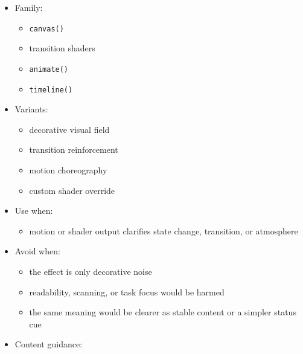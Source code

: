 \begin{itemize}
\tightlist
\item
  Family:

  \begin{itemize}
  \tightlist
  \item
    \texttt{c\allowbreak{}a\allowbreak{}n\allowbreak{}v\allowbreak{}a\allowbreak{}s\allowbreak{}(\allowbreak{})}
  \item
    transition shaders
  \item
    \texttt{a\allowbreak{}n\allowbreak{}i\allowbreak{}m\allowbreak{}a\allowbreak{}t\allowbreak{}e\allowbreak{}(\allowbreak{})}
  \item
    \texttt{t\allowbreak{}i\allowbreak{}m\allowbreak{}e\allowbreak{}l\allowbreak{}i\allowbreak{}n\allowbreak{}e\allowbreak{}(\allowbreak{})}
  \end{itemize}
\item
  Variants:

  \begin{itemize}
  \tightlist
  \item
    decorative visual field
  \item
    transition reinforcement
  \item
    motion choreography
  \item
    custom shader override
  \end{itemize}
\item
  Use when:

  \begin{itemize}
  \tightlist
  \item
    motion or shader output clarifies state change, transition, or atmosphere
  \end{itemize}
\item
  Avoid when:

  \begin{itemize}
  \tightlist
  \item
    the effect is only decorative noise
  \item
    readability, scanning, or task focus would be harmed
  \item
    the same meaning would be clearer as stable content or a simpler status cue
  \end{itemize}
\item
  Content guidance:


\end{itemize}
